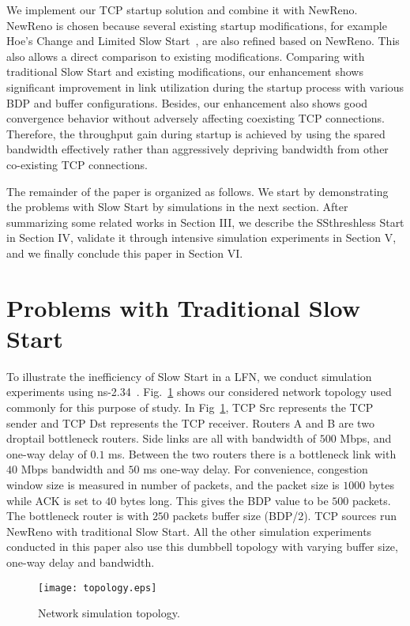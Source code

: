 \documentclass[12pt,onecolumn]{IEEEtran}
\begin{document}
We implement our TCP startup solution and combine it with NewReno. NewReno is
chosen because several existing startup modifications, for example Hoe's Change
\cite{hoe} and Limited Slow Start~\cite{limited}, are also refined based on
NewReno. This also allows a direct comparison to existing modifications.
Comparing with traditional Slow Start and existing modifications, our
enhancement shows significant improvement in link utilization during the
startup process with various BDP and buffer configurations. Besides, our
enhancement also shows good convergence behavior without adversely affecting
coexisting TCP connections. Therefore, the throughput gain during startup is
achieved by using the spared bandwidth effectively rather than aggressively
depriving bandwidth from other co-existing TCP connections.

The remainder of the paper is organized as follows. We start by demonstrating
the problems with Slow Start by simulations in the next section. After
summarizing some related works in Section III, we describe the SSthreshless
Start in Section IV, validate it through intensive simulation experiments in
Section V, and we finally conclude this paper in Section VI.


\section{Problems with Traditional Slow Start}

To illustrate the inefficiency of Slow Start in a LFN, we conduct simulation
experiments using ns-2.34~\cite{NS}. Fig.~\ref{fig_topology} shows our
considered network topology used commonly for this purpose of study. In
Fig~\ref{fig_topology}, TCP Src represents the TCP sender and TCP Dst
represents the TCP receiver. Routers A and B are two droptail bottleneck
routers. Side links are all with bandwidth of $500$ Mbps, and one-way delay of
$0.1$ ms. Between the two routers there is a bottleneck link with $40$ Mbps
bandwidth and $50$ ms one-way delay. For convenience, congestion window size is measured
in number of packets, and the packet size is $1000$ bytes while ACK is set to
$40$ bytes long. This gives the BDP value to be $500$ packets. The bottleneck
router is with $250$ packets buffer size (BDP/2). TCP sources run NewReno with
traditional Slow Start. All the other simulation experiments conducted in this
paper also use this dumbbell topology with varying buffer size, one-way delay
and bandwidth.


\begin{figure}[t]
\centering
\texttt{[image: topology.eps]}
\caption{Network simulation topology.} \label{fig_topology}
\end{figure}
\end{document}
